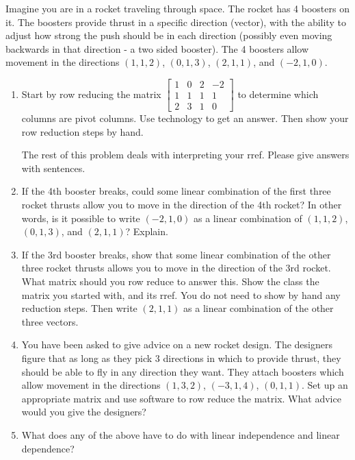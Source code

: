\begin{problem}\label{rocket booster problem}
Imagine you are in a rocket traveling through space.  The rocket has 4 boosters on it.  The boosters provide thrust in a specific direction (vector), with the ability to adjust how strong the push should be in each direction (possibly even moving backwards in that direction - a two sided booster). The 4 boosters allow movement in the directions $(1,1,2)$, $(0,1,3)$, $(2,1,1)$, and $(-2,1,0)$.
\begin{enumerate}
 \item 
{}%
Start by row reducing the matrix 
$\begin{bmatrix}
1 & 0 & 2 & -2 \\
1 & 1 & 1 & 1 \\
2 & 3 & 1 & 0
\end{bmatrix}$ to determine which columns are pivot columns. Use technology to get an answer. Then show your row reduction steps by hand. 

The rest of this problem deals with interpreting your rref.  Please give answers with sentences.
 \item If the 4th booster breaks, could some linear combination of the first three rocket thrusts allow you to move in the direction of the 4th rocket? In other words, is it possible to write $(-2,1,0)$ as a linear combination of $(1,1,2)$, $(0,1,3)$, and $(2,1,1)$? Explain.
 \item If the 3rd booster breaks, show that some linear combination of the other three rocket thrusts allows you to move in the direction of the 3rd rocket. What matrix should you row reduce to answer this. Show the class the matrix you started with, and its rref. You do not need to show by hand any reduction steps. Then write $(2,1,1)$ as a linear combination of the other three vectors. 
 \item You have been asked to give advice on a new rocket design. The designers figure that as long as they pick 3 directions in which to provide thrust, they should be able to fly in any direction they want. They attach boosters which allow movement in the directions $(1,3,2)$, $(-3,1,4)$, $(0,1,1)$. Set up an appropriate matrix and use software to row reduce the matrix. What advice would you give the designers?
 \item What does any of the above have to do with linear independence and linear dependence?
\end{enumerate}
\end{problem}



